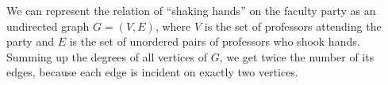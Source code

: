 \exercise
We can represent the relation of ``shaking hands'' on the faculty party as an undirected graph $G=(V,E)$, where $V$ is the set of professors attending the party and $E$ is the set of unordered pairs of professors who shook hands.
Summing up the degrees of all vertices of $G$, we get twice the number of its edges, because each edge is incident on exactly two vertices.
